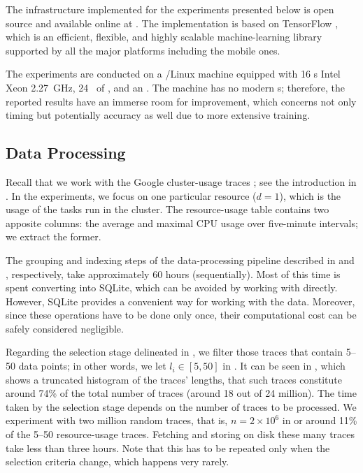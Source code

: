 The infrastructure implemented for the experiments presented below is open
source and available online at \cite{sources}. The implementation is based on
TensorFlow \cite{abadi2015}, which is an efficient, flexible, and highly
scalable machine-learning library supported by all the major platforms including
the mobile ones.

The experiments are conducted on a /Linux machine equipped with 16
s Intel Xeon  2.27~GHz, 24~ of , and an
. The machine has no modern s; therefore, the reported results
have an immerse room for improvement, which concerns not only timing but
potentially accuracy as well due to more extensive training.

\subsection{Data Processing}
Recall that we work with the Google cluster-usage traces \cite{reiss2011}; see
the introduction in . In the experiments, we focus on one particular
resource ($d = 1$), which is the  usage of the tasks run in the cluster.
The resource-usage table contains two apposite columns: the average and maximal
CPU usage over five-minute intervals; we extract the former.

The grouping and indexing steps of the data-processing pipeline described in
 and , respectively, take approximately 60 hours
(sequentially). Most of this time is spent converting  into SQLite,
which can be avoided by working with  directly. However, SQLite provides
a convenient way for working with the data. Moreover, since these operations
have to be done only once, their computational cost can be safely considered
negligible.


Regarding the selection stage delineated in , we filter those
traces that contain 5--50 data points; in other words, we let $l_i \in [5, 50]$
in . It can be seen in , which shows a truncated
histogram of the traces' lengths, that such traces constitute around 74\% of the
total number of traces (around 18 out of 24 million). The time taken by the
selection stage depends on the number of traces to be processed. We experiment
with two million random traces, that is, $n = 2 \times 10^6$ in  or
around 11\% of the 5--50 resource-usage traces. Fetching and storing on disk
these many traces take less than three hours. Note that this has to be repeated
only when the selection criteria change, which happens very rarely.

